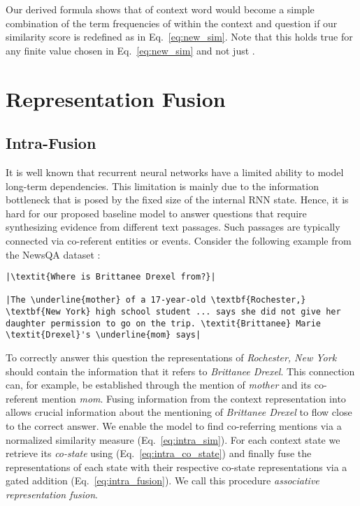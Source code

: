 \documentclass[11pt,a4paper]{article}
\begin{document}
Our derived formula shows that  of context word  would become a simple combination of the term frequencies of  within the context and question if our similarity score is redefined as in Eq.~\ref{eq:new_sim}. Note that this holds true for any finite value chosen in Eq.~\ref{eq:new_sim} and not just .

\section{Representation Fusion}\label{sec:rep_fusion}
\subsection{Intra-Fusion}
It is well known that recurrent neural networks have a limited ability to model long-term dependencies. This limitation is mainly due to the information bottleneck that is posed by the fixed size of the internal RNN state. Hence, it is hard for our proposed baseline model to answer questions that require synthesizing evidence from different text passages. Such passages are typically connected via co-referent entities or events. Consider the following example from the NewsQA dataset \cite{Trischler2017}:

\begin{mdframed}[roundcorner=2pt]
\begin{lstlisting}[basicstyle=\small\normalfont]
|\textit{Where is Brittanee Drexel from?}|

|The \underline{mother} of a 17-year-old \textbf{Rochester,} \textbf{New York} high school student ... says she did not give her daughter permission to go on the trip. \textit{Brittanee} Marie \textit{Drexel}'s \underline{mom} says|
\end{lstlisting}
\end{mdframed}
\noindent
To correctly answer this question the representations of \textit{Rochester, New York} should contain the information that it refers to \textit{Brittanee Drexel}. This connection can, for example, be established through the mention of \textit{mother} and its co-referent mention \textit{mom}. Fusing information from the context representation  into  allows crucial information about the mentioning of \textit{Brittanee Drexel} to flow close to the correct answer. We enable the model to find co-referring mentions via a normalized similarity measure  (Eq.~\ref{eq:intra_sim}). For each context state we retrieve its \textit{co-state} using  (Eq.~\ref{eq:intra_co_state}) and finally fuse the representations of each state with their respective co-state representations via a gated addition (Eq.~\ref{eq:intra_fusion}). We call this procedure \textit{associative representation fusion}. 
\end{document}
